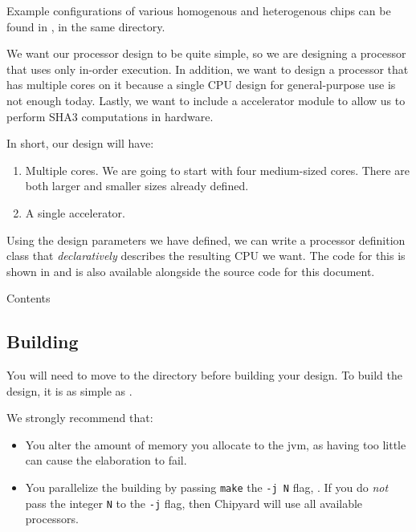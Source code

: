 \begin{blackbox}
  Example configurations of various homogenous and heterogenous chips can be found in , in the same directory.
\end{blackbox}

We want our processor design to be quite simple, so we are designing a processor that uses only in-order execution.
In addition, we want to design a processor that has multiple cores on it because a single CPU design for general-purpose use is not enough today.
Lastly, we want to include a  accelerator module to allow us to perform SHA3 computations in hardware.

In short, our design will have:
\begin{enumerate}
\item Multiple  cores.
  We are going to start with four medium-sized cores.
  There are both larger and smaller sizes already defined.
\item A single  accelerator.
\end{enumerate}

Using the design parameters we have defined, we can write a processor definition class that \emph{declaratively} describes the resulting CPU we want.
The code for this is shown in  and is also available alongside the source code for this document.

\begin{listing}[h!tbp]
\caption{ Contents}
\label{lst:Custom_Config-NewTestConfig}
\end{listing}

\subsection{Building}\label{sec:Custom_Config-Building}
You will need to move to the  directory before building your design.
To build the design, it is as simple as .

We strongly recommend that:
\begin{itemize}
\item You alter the amount of memory you allocate to the \Gls{jvm}, as having too little can cause the \gls{elaboration} to fail.
\item You parallelize the building by passing \texttt{make} the \texttt{-j N} flag, .
  If you do \emph{not} pass the integer \texttt{N} to the \texttt{-j} flag, then Chipyard will use all available processors.
\end{itemize}

